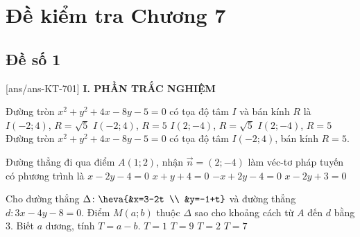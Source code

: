 \section*{Đề kiểm tra Chương 7}
\subsection*{Đề số 1}
\setcounter{ex}{0}\setcounter{bt}{0}
[ans/ans-KT-701]
\noindent\textbf{I. PHẦN TRẮC NGHIỆM}
\begin{ex}%
	Đường tròn $x^2 + y^2 + 4x- 8y - 5 = 0$ có tọa độ tâm $I$ và bán kính $R$ là
	\choice
	{$I(-2;4)$, $R = \sqrt{5}$}
	{\True $I(-2;4)$, $R = 5$}
	{$I(2;-4)$, $R = \sqrt{5}$}
	{$I(2;-4)$, $R = 5$}
	\loigiai
	{
		Đường tròn $x^2 + y^2 + 4x- 8y - 5 = 0$ có tọa độ tâm $I(-2;4)$, bán kính $R = 5$.
	}
\end{ex}

\begin{ex}%
	Đường thẳng đi qua điểm $A(1; 2)$, nhận $\vec{n}=(2;-4)$ làm véc-tơ pháp tuyến có phương trình là
	\choice
	{$x-2y-4=0$}
	{$x+y+4=0$}
	{$-x+2y-4=0$}
	{\True $x-2y+3=0$}
\end{ex}	
	
	\begin{ex}%
		Cho đường thẳng $\Delta\colon\heva{&x=3-2t \\ &y=-1+t}$ và đường thẳng $d\colon 3x-4y-8=0$. Điểm $M(a;b)$ thuộc $\Delta$ sao cho khoảng cách từ $A$ đến $d$ bằng $3$. Biết $a$ dương, tính $T=a-b$.
		\choice
		{$T=1$}
		{$T=9$}
		{$T=2$}
		{\True $T=7$}
	\end{ex}	
	
